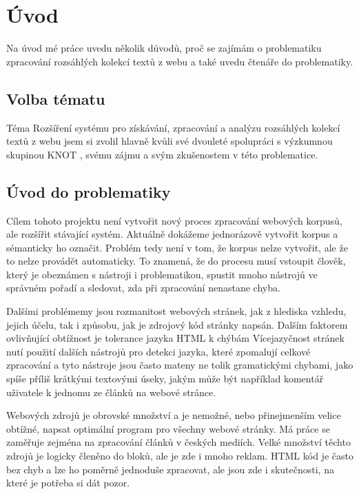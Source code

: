 
\chapter{Úvod}
Na úvod mé práce uvedu několik důvodů, proč se zajímám o problematiku zpracování
rozsáhlých kolekcí textů z webu a také uvedu čtenáře do problematiky.
\section{Volba tématu}
Téma Rozšíření systému pro získávání, zpracování a analýzu rozsáhlých kolekcí textů z webu
jsem si zvolil hlavně kvůli své dvouleté spolupráci s výzkumnou skupinou KNOT \cite{KNOT}, svému zájmu a
svým zkušenostem v této problematice.
\section{Úvod do problematiky}
Cílem tohoto projektu není vytvořit nový proces zpracování webových korpusů, ale rozšířit stávající
systém. Aktuálně dokážeme jednorázově vytvořit korpus a sémanticky ho označit. Problém tedy není v tom,
že korpus nelze vytvořit, ale že to nelze provádět automaticky. To znamená, že do procesu musí vstoupit
člověk, který je obeznámen s nástroji i problematikou, spustit mnoho nástrojů ve správném pořadí a
sledovat, zda při zpracování nenastane chyba.

Dalšími problémemy jsou rozmanitost webových stránek, jak z hlediska vzhledu, jejich účelu, tak i
způsobu, jak je zdrojový kód stránky napsán. Dalším faktorem ovlivňující obtížnost je tolerance jazyka HTML k chýbám
Vícejazyčnost stránek nutí použití dalších nástrojů pro detekci jazyka, které zpomalují celkové zpracování
a tyto nástroje jsou často mateny ne tolik gramatickými chybami, jako spíše příliš krátkými textovými úseky,
jakým může být například komentář uživatele k jednomu ze článků na webové stránce.

Webových zdrojů je obrovské množství a je nemožné, nebo přinejmenším velice obtížné, napsat optimální program
pro všechny webové stránky. Má práce se zaměřuje zejména na zpracování článků v českých mediích. Velké množství těchto zdrojů
je logicky členěno do bloků, ale je zde i mnoho reklam. HTML kód je často bez chyb a lze ho poměrně jednoduše
zpracovat, ale jsou zde i skutečnosti, na které je potřeba si dát pozor.


